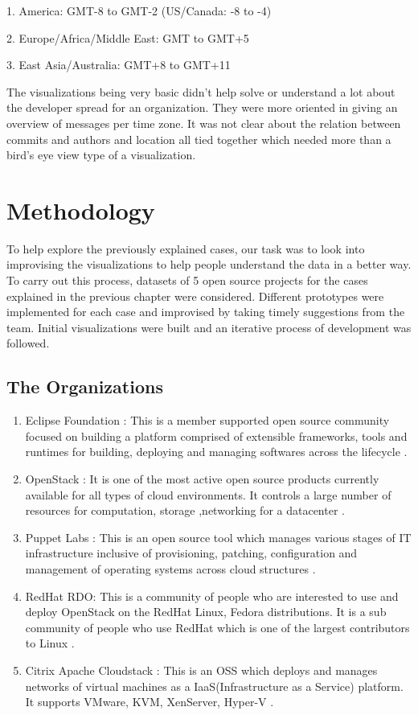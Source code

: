\documentclass[seploa]{beavtex}
\begin{document}
1. America: GMT-8 to GMT-2 (US/Canada: -8 to -4)

2. Europe/Africa/Middle East: GMT to GMT+5

3. East Asia/Australia: GMT+8 to GMT+11


The visualizations being very basic didn't help solve or understand a lot about the developer spread for an organization. They were more oriented in giving an overview of messages per time zone. It was not clear about the relation between commits and authors and location all tied together which needed more than a bird's eye view type of a visualization. 


\chapter{Methodology}
To help explore the previously explained cases, our task was to look into improvising the visualizations to help people understand the data in a better way. To carry out this process, datasets of 5 open source projects for the cases explained in the previous chapter were considered. Different prototypes were implemented for each case and improvised by taking timely suggestions from the team. Initial visualizations were built and an iterative process of development was followed.

\section{The Organizations}
\begin{enumerate}
\item Eclipse Foundation :
This is a member supported open source community focused on building a platform comprised of extensible frameworks, tools and runtimes for building, deploying and managing softwares across the lifecycle \cite{eclipse}.
\item OpenStack :
It is one of the most active open source products currently available for all types of cloud environments. It controls a large number of resources for computation, storage ,networking for a datacenter \cite{openstack}.
\item Puppet Labs :
This is an open source tool which manages various stages of IT infrastructure inclusive of provisioning, patching, configuration and management of operating systems across cloud structures \cite{puppet}.
\item RedHat RDO:
This is a community of people who are interested to use and deploy OpenStack on the RedHat Linux, Fedora distributions. It is a sub community of people who use RedHat which is one of the largest contributors to Linux \cite{rdo}.
\item Citrix Apache Cloudstack :
This is an OSS which deploys and manages networks of virtual machines as a IaaS(Infrastructure as a Service) platform. It supports VMware, KVM, XenServer, Hyper-V \cite{apache}.
\end{enumerate}
\end{document}
